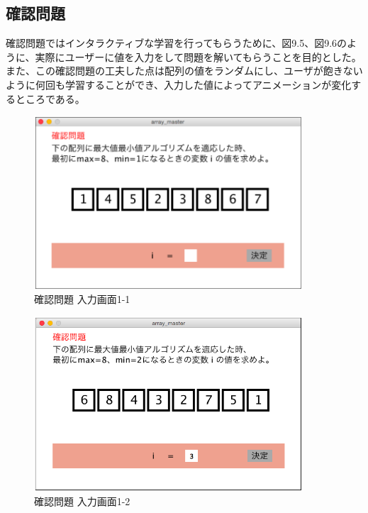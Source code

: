 \documentclass[openany,11pt,papersize]{jsbook}
\begin{document}

\subsection{確認問題}
確認問題ではインタラクティブな学習を行ってもらうために、図9.5、図9.6のように、実際にユーザーに値を入力をして問題を解いてもらうことを目的とした。また、この確認問題の工夫した点は配列の値をランダムにし、ユーザが飽きないように何回も学習することができ、入力した値によってアニメーションが変化するところである。


\begin{figure}[H]
\begin{center}
\includegraphics[width=10cm, bb=0 0 798 516]{img/9thParagraph/kakuninmondai_01.png}
\end{center}
\caption{確認問題 入力画面1-1}
\end{figure}

\begin{figure}[H]
\begin{center}
\includegraphics[width=10cm, bb=0 0 647 422]{img/9thParagraph/kakuninmondai_02.png}
\end{center}
\caption{確認問題 入力画面1-2}
\end{figure}
\end{document}
